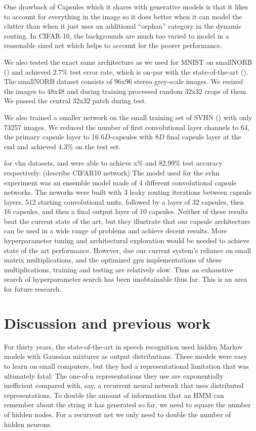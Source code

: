 \documentclass{article}
\begin{document}
 One drawback of Capsules which it shares with generative models is that it likes to account for everything in the image so it does better when it can model the clutter than when it just uses an additional “orphan” category in the dynamic routing. In CIFAR-10, the backgrounds are much too varied to model in a reasonable sized net which helps to account for the poorer performance.

We also tested the exact same architecture as we used for MNIST on smallNORB (\cite{lecun2004learning}) and achieved $2.7\%$ test error rate, which is on-par with the state-of-the-art (\cite{cirecsan2011high}). The smallNORB dataset consists of 96x96 stereo grey-scale images. We resized the images to 48x48 and during training processed random 32x32 crops of them. We passed the central 32x32 patch during test. 

We also trained a smaller network on the small training set of SVHN (\cite{netzer2011reading}) with only 73257 images. We reduced the number of first convolutional layer channels to 64, the primary capsule layer to 16 $6D$-capsules with $8D$ final capsule layer at the end and achieved $4.3\%$ on the test set. 

for vhn datasets, and were able to achieve x\% and 82.99\% test accuracy respectively. 
(describe CIFAR10 network)
The model used for the svhn experiment was an ensemble model made of 4 different convolutional capsule networks. The neworks were built with 3 leaky routing iterations between capsule layers, 512 starting convolutional units, followed by a layer of 32 capsules, then 16 capsules, and then a final output layer of 10 capsules.
Neither of these results beat the current state of the art, but they illustrate that our capsule architecture can be used in a wide range of problems and achieve decent results. More hyperparameter tuning and architectural exploration would be needed to achieve state of the art performance. However, due our current system's reliance on  small matrix multiplications, and the optimized gpu implementations of these multiplications, training and testing are relatively slow. Thus an exhaustive search of hyperparameter search has been unobtainable thus far. This is an area for future research. 

\section{Discussion and previous work}

For thirty years, the state-of-the-art in speech recognition used hidden Markov models with Gaussian mixtures as output distributions. These models were easy to learn on small computers, but they had a representational limitation that was ultimately fatal: The one-of-n representations they use are exponentially inefficient compared with, say, a recurrent neural network that uses distributed representations. To double the amount of information that an HMM can remember about the string it has generated so far, we need to square the number of hidden nodes.  For a recurrent net we only need to double the number of hidden neurons.  
\end{document}
